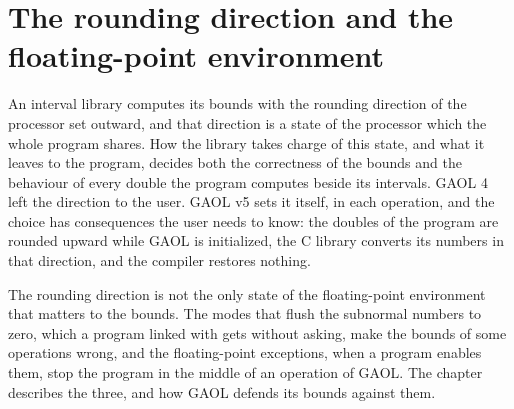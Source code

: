 \documentclass[12pt,a4paper,twoside,openright]{book}
\begin{document}

\chapter{The rounding direction and the floating-point environment}
\label{chap:rounding}

An interval library computes its bounds with the rounding direction of the
processor set outward, and that direction is a state of the processor which
the whole program shares. How the library takes charge of this state, and
what it leaves to the program, decides both the correctness of the bounds and
the behaviour of every double the program computes beside its intervals. GAOL
4 left the direction to the user. GAOL v5 sets it itself, in each operation,
and the choice has consequences the user needs to know: the doubles of the
program are rounded upward while GAOL is initialized, the C library converts
its numbers in that direction, and the compiler restores nothing.

\medskip
The rounding direction is not the only state of the floating-point
environment that matters to the bounds. The modes that flush the subnormal
numbers to zero, which a program linked with  gets without
asking, make the bounds of some operations wrong, and the floating-point
exceptions, when a program enables them, stop the program in the middle of an
operation of GAOL. The chapter describes the three, and how GAOL defends its
bounds against them.
\end{document}

